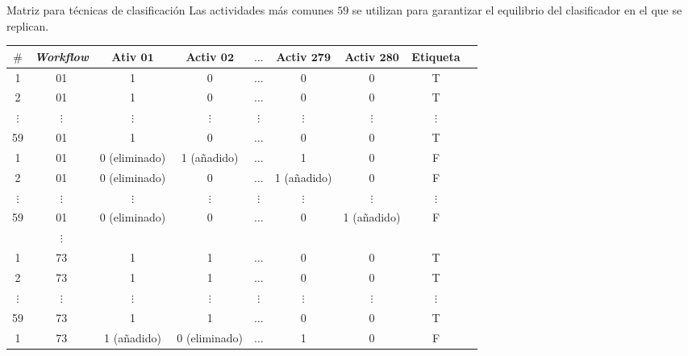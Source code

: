 \begin{frame}		
	\begin{block}{Matriz para técnicas de clasificación}
		Las actividades más comunes \(59\) se utilizan para garantizar el equilibrio del clasificador en el que se replican.
		\begin{table}[!htb]
			\tiny
			\centering
			\begin{tabular}{|c|c|c|c|c|c|c|c|c|}  \hline
				\textbf{\(\#\)} & \textbf{\emph{Workflow}} & \textbf{Ativ \(\mathbf{01}\)} & \textbf{Activ \(\mathbf{02}\)} & \textbf{\(\mathbf{\ldots}\)}  & \textbf{Activ \(\mathbf{279}\)} & \textbf{Activ \(\mathbf{280}\)} & \textbf{Etiqueta} \\ \hline
				
				1	&		01		 			   & 1 			  & 0 			  & \(\ldots\) 	  & 0 & 0  			& T	\\ \hline
				2	&		01 					   & 1 			  & 0 			  & \(\ldots\) 	  & 0 & 0  			& T	\\ \hline
				\(\vdots\)  &  \(\vdots\) 	   	   & \(\vdots\)   & \(\vdots\) 	  & \(\vdots\) 	  & \(\vdots\) & \(\vdots\) & \(\vdots\)\\ \hline
				59	&		01 					   & 1 			  & 0 			  & \(\ldots\) 	  & 0 & 0   		& T	\\ \hline
				1	&		01		 			   & 0 (eliminado) 		  & 1 (añadido) &\(\ldots\)& 1 & 0	& F	\\ \hline
				2	&		01 					   & 0 (eliminado)& 0 		  & \(\ldots\) 	  & 1 (añadido) & 0& F	\\ \hline
				\(\vdots\)  &		\(\vdots\) 	   & \(\vdots\) & \(\vdots\) 	  & \(\vdots\) 	  & \(\vdots\) & \(\vdots\) & \(\vdots\) \\ \hline
				59	&		01 					   & 0 (eliminado)			  & 0 			  & \(\ldots\) & 0 & 1 (añadido)& F \\ \hline
				&\(\vdots\) & & & & & & 																		\\ \hline
				1	&		73		 			   & 1 			  & 1  & \(\ldots\) 	  & 0 & 0  			& T	\\ \hline
				2	&		73 					   & 1 			  & 1  & \(\ldots\) 	  & 0 & 0  			& T	\\ \hline
				\(\vdots\)  &		\(\vdots\) 	   & \(\vdots\)   & \(\vdots\) 	  & \(\vdots\) 	  & \(\vdots\) & \(\vdots\) & \(\vdots\) \\ \hline
				59	&		73 					   & 1 			  & 1  & \(\ldots\) 	  & 0 & 0   		& T	\\ \hline
				1	&		73		 			   & 1 (añadido) & 0 (eliminado)  & \(\ldots\) 	  & 1 & 0   		& F	\\ \hline

\end{tabular}
\end{table}
\end{block}
\end{frame}
